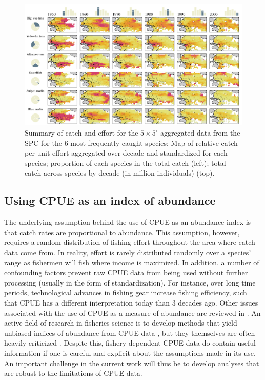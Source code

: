 \documentclass{article}
\newcommand{\griddef}[2]{$#1 \times #2^\circ$}
\begin{document}
\begin{figure}
\includegraphics[scale=0.725]{PhD_Proposal_Spring2013_Fig1_nogrid}
\caption{\label{fig1}
Summary of catch-and-effort for the \griddef{5}{5} aggregated data from
  the SPC for the 6 most frequently caught species: Map of relative
  catch-per-unit-effort aggregated over decade and standardized for
  each species; proportion of
  each species in the total catch (left); total catch across species
  by decade  (in million individuals) (top).}
\end{figure}

\subsection{Using CPUE as an index of abundance}

The underlying assumption behind the use of CPUE as
an abundance index is that catch rates are proportional to
abundance. This assumption, however, requires a random distribution of fishing
effort throughout the area where catch data come from. In reality, effort is rarely distributed randomly
over a species' range as fishermen will fish where income is
maximized. In addition, a number of confounding factors prevent raw
CPUE data from being used without further processing (usually in the form of
standardization). For instance, over long time periods, technological
advances in fishing gear increase fishing efficiency, such that CPUE
has a different interpretation today than 3 decades ago. Other issues
associated with the use of CPUE as a measure of abundance are reviewed
in \citet{Harley2001_a}. An active field of research in fisheries
science is to develop methods that yield unbiased indices of
abundance from CPUE data \citep[e.g.][]{Campbell2004_a}, but they
themselves are often heavily criticized
\citep{Carruthers2010_a}. Despite this, fishery-dependent CPUE data do
contain useful information if one is careful and explicit
about the assumptions made in its use. An important challenge in
the current work will thus be to develop analyses that are robust to
the limitations of CPUE data.
\end{document}
